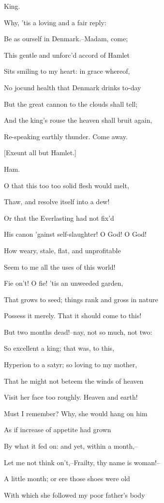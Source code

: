 \documentclass[12pt]{book}
\begin{document}
King.

Why, 'tis a loving and a fair reply:

Be as ourself in Denmark.--Madam, come;

This gentle and unforc'd accord of Hamlet

Sits smiling to my heart: in grace whereof,

No jocund health that Denmark drinks to-day

But the great cannon to the clouds shall tell;

And the king's rouse the heaven shall bruit again,

Re-speaking earthly thunder. Come away.



[Exeunt all but Hamlet.]



Ham.

O that this too too solid flesh would melt,

Thaw, and resolve itself into a dew!

Or that the Everlasting had not fix'd

His canon 'gainst self-slaughter! O God! O God!

How weary, stale, flat, and unprofitable

Seem to me all the uses of this world!

Fie on't! O fie! 'tis an unweeded garden,

That grows to seed; things rank and gross in nature

Possess it merely. That it should come to this!

But two months dead!--nay, not so much, not two:

So excellent a king; that was, to this,

Hyperion to a satyr; so loving to my mother,

That he might not beteem the winds of heaven

Visit her face too roughly. Heaven and earth!

Must I remember? Why, she would hang on him

As if increase of appetite had grown

By what it fed on: and yet, within a month,--

Let me not think on't,--Frailty, thy name is woman!--

A little month; or ere those shoes were old

With which she followed my poor father's body
\end{document}

